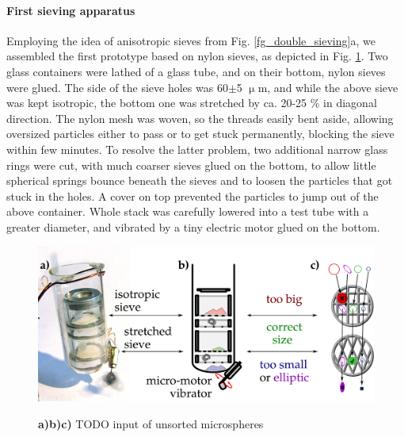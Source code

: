 \paragraph{First sieving apparatus}%
Employing the idea of anisotropic sieves from Fig. \ref{fg_double_sieving}a, we assembled the first prototype based on nylon sieves, as depicted in Fig. \ref{fg_sieving1}. Two glass containers were lathed of a 
glass tube, and on their bottom, nylon sieves were glued. The side of the sieve holes was 60$\pm$5 $\upmu$m, and while the above sieve was kept isotropic, the bottom one was stretched by ca. 20-25 \% in diagonal direction. The nylon mesh was woven, so the threads easily bent aside, allowing oversized particles either to pass or to get stuck permanently, blocking the sieve within few minutes. To resolve the latter problem, two additional narrow glass rings were cut, with much coarser sieves glued on the bottom, to allow little spherical springs bounce beneath the sieves and to loosen the particles that got stuck in the holes. A cover on top prevented the particles to jump out of the above container. Whole stack was carefully lowered into a test tube with a greater diameter, and vibrated by a tiny electric motor glued on the bottom.
\begin{figure} \caption{\textbf{a)}\textbf{b)}\textbf{c)} TODO input of unsorted microspheres}  \centering \includegraphics[width=12cm]{img/expe/sieving1.pdf} \label{fg_sieving1} \end{figure} 

